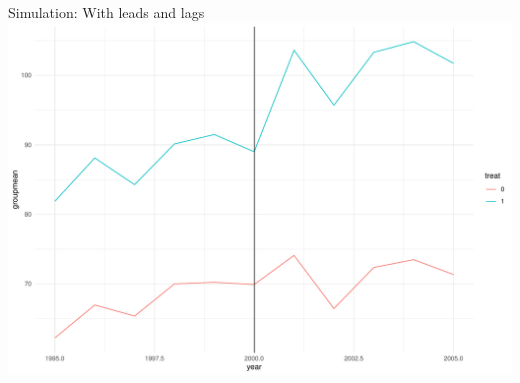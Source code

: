 \documentclass[
  ignorenonframetext,
]{beamer}
\begin{document}
\begin{frame}{Simulation: With leads and lags}
\protect\hypertarget{simulation-with-leads-and-lags-5}{}
\includegraphics{Slides8_DID_files/figure-beamer/didplot_fig-1.pdf}
\end{frame}
\end{document}
